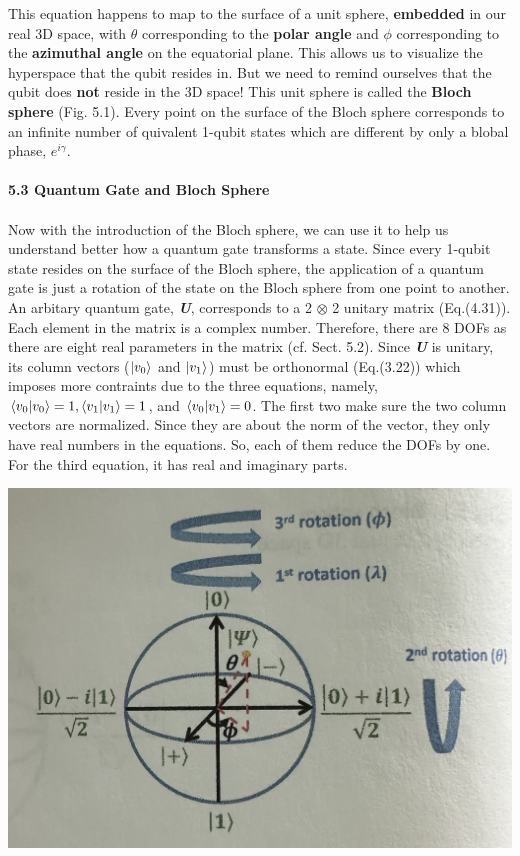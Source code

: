 \documentclass{article}
\newcommand{\bfit}[1]{\textit{\textbf{#1}}}
\begin{document}
This equation happens to map to the surface of a unit sphere, \textbf{embedded} in our
real 3D space, with $\theta$ corresponding to the \textbf{polar angle} and $\phi$
corresponding to the \textbf{azimuthal angle} on the equatorial plane. 
This allows us to visualize the hyperspace that the qubit resides in. But we need to remind
ourselves that the qubit does \textbf{not} reside in the 3D space! This unit sphere
is called the \textbf{Bloch sphere} (Fig. 5.1). Every point on the surface of the Bloch sphere corresponds to an 
infinite number of quivalent 1-qubit states which are different by only a blobal phase, $e^{i\gamma}$.
\\\\
\textbf{\large 5.3 Quantum Gate and Bloch Sphere}\\\\
Now with the introduction of the Bloch sphere, we can use it to
help us understand better how a quantum gate transforms a state. Since 
every 1-qubit state resides on the surface of the Bloch sphere,
the application of a quantum gate is just a rotation of the state
on the Bloch sphere from one point to another. An arbitary quantum gate,
\bfit{U}, corresponds to a 2 $\otimes$ 2 unitary matrix (Eq.(4.31)).
Each element in the matrix is a complex number. Therefore, there are 8 DOFs as
there are eight real parameters in the matrix (cf. Sect. 5.2). Since \bfit{U}
is unitary, its column vectors ($\ket{v_0}$ and $\ket{v_1}$) must be 
orthonormal (Eq.(3.22)) which imposes more contraints due to the three equations, namely, 
$\braket{v_0|v_0}=1, \braket{v_1|v_1} =1$, and $\braket{v_0|v_1}=0$.
The first two make sure the two column vectors are normalized.
Since they are about the norm of the vector, they only have real numbers in the
equations. So, each of them reduce the DOFs by one. For the third equation, it has
real and imaginary parts.
\begin{center}
    \includegraphics[scale=0.4]{Fig.5.2.jpeg}
\end{center}
\end{document}
